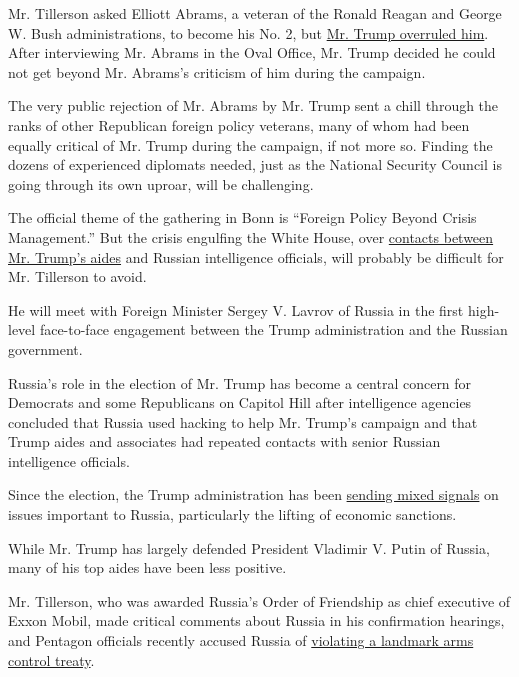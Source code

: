 Mr. Tillerson asked Elliott Abrams, a veteran of the Ronald Reagan and
George W. Bush administrations, to become his No. 2, but
\href{https://www.nytimes.com/2017/02/10/us/politics/trump-wall-21-billion-dollars.html}{Mr.
Trump overruled him}. After interviewing Mr. Abrams in the Oval Office,
Mr. Trump decided he could not get beyond Mr. Abrams's criticism of him
during the campaign.

The very public rejection of Mr. Abrams by Mr. Trump sent a chill
through the ranks of other Republican foreign policy veterans, many of
whom had been equally critical of Mr. Trump during the campaign, if not
more so. Finding the dozens of experienced diplomats needed, just as the
National Security Council is going through its own uproar, will be
challenging.

The official theme of the gathering in Bonn is ``Foreign Policy Beyond
Crisis Management.'' But the crisis engulfing the White House, over
\href{https://www.nytimes.com/2017/02/14/us/politics/russia-intelligence-communications-trump.html}{contacts
between Mr. Trump's aides} and Russian intelligence officials, will
probably be difficult for Mr. Tillerson to avoid.

He will meet with Foreign Minister Sergey V. Lavrov of Russia in the
first high-level face-to-face engagement between the Trump
administration and the Russian government.

Russia's role in the election of Mr. Trump has become a central concern
for Democrats and some Republicans on Capitol Hill after intelligence
agencies concluded that Russia used hacking to help Mr. Trump's campaign
and that Trump aides and associates had repeated contacts with senior
Russian intelligence officials.

Since the election, the Trump administration has been
\href{https://www.nytimes.com/2017/02/14/world/europe/michael-flynn-russia.html}{sending
mixed signals} on issues important to Russia, particularly the lifting
of economic sanctions.

While Mr. Trump has largely defended President Vladimir V. Putin of
Russia, many of his top aides have been less positive.

Mr. Tillerson, who was awarded Russia's Order of Friendship as chief
executive of Exxon Mobil, made critical comments about Russia in his
confirmation hearings, and Pentagon officials recently accused Russia of
\href{https://www.nytimes.com/2017/02/14/world/europe/russia-cruise-missile-arms-control-treaty.html}{violating
a landmark arms control treaty}.

